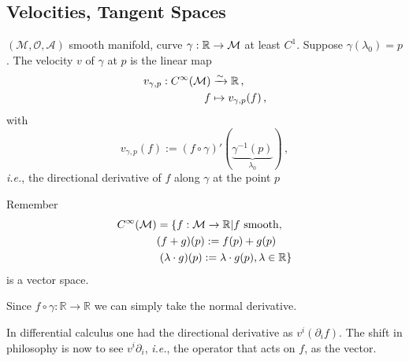 \documentclass[11pt, a4paper, twocolumn]{article} %
\begin{document}
\subsection{Velocities, Tangent Spaces}
\begin{defn}[Velocity]
    \label{defn:velocity}
    $(\mathcal{M,O,A})$ smooth manifold, curve $\gamma: \mathbb{R}\to \mathcal{M}$ at least $C^1$.
    Suppose $\gamma(\lambda_0) = p$.
    The velocity $v$ of $\gamma$ at $p$ is the linear map
    \begin{align*}
        v_{\gamma, p}: C^\infty(\mathcal{M}) &\xrightarrow[]{\sim} \mathbb{R}\,,\\
        f &\mapsto v_{\gamma, p}(f)\,,
    \end{align*}
    with
    \begin{equation}
        \boxed{
        v_{\gamma,p}(f) := (f \circ \gamma)'(\underbrace{\gamma^{-1}(p)}_{\lambda_0})
    }\,,
    \label{eq:defVelocity}
    \end{equation}
    \textit{i.e.}, the directional derivative of $f$ along $\gamma$ at the point $p$
\end{defn}
\begin{note}
    Remember 
    \begin{align}
        C^\infty(\mathcal{M}) &= \left\{ f: \mathcal{M}\to\mathbb{R} | f \text{ smooth, }\right. \nonumber\\
            &(f+g)(p):= f(p) + g(p)\\
            &\left.(\lambda \cdot g)(p) := \lambda \cdot g(p), \lambda \in \mathbb{R}\right\}\nonumber
    \end{align}
    is a vector space.
\end{note}
Since $f\circ\gamma: \mathbb{R}\to\mathbb{R}$ we can simply take the normal derivative.
\begin{center}
\end{center}
\begin{note}
    In differential calculus one had the directional derivative as $v^i(\partial_i f)$.
    The shift in philosophy is now to see $v^i\partial_i$, \textit{i.e.}, the operator
    that acts on $f$, as the vector.
\end{note}
\end{document}
